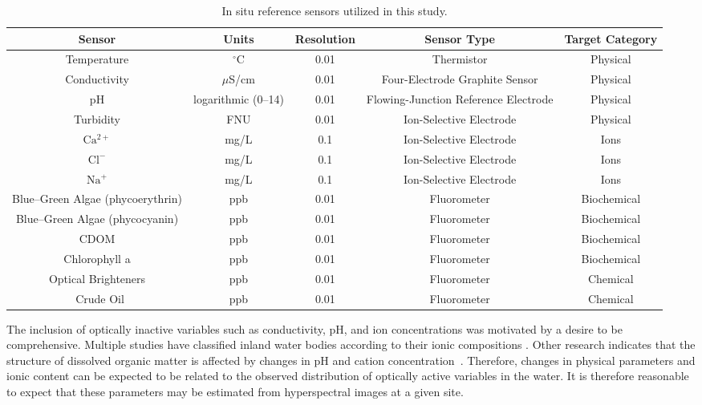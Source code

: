 \begin{sidewaystable}[p!]
  \caption{In situ reference sensors utilized in this study.}
  \label{tab:sensors}
  \begin{center}
    \begin{tabular}{ccccc} \hline
      \textbf{Sensor}	& \textbf{Units} & \textbf{Resolution} & \textbf{Sensor Type} & \textbf{Target Category}\\ \hline
      Temperature & $^{\circ}$C & 0.01 & Thermistor & Physical \\
      Conductivity & $\mu$S/cm & 0.01 & Four-Electrode Graphite Sensor & Physical  \\
      pH & logarithmic (0--14) & 0.01 & Flowing-Junction Reference Electrode & Physical \\
      Turbidity & FNU & 0.01 & Ion-Selective Electrode & Physical \\
      $\mathrm{Ca^{2+}}$ & mg/L & 0.1 & Ion-Selective Electrode & Ions \\
      $\mathrm{Cl^-}$ & mg/L & 0.1 & Ion-Selective Electrode & Ions \\
      $\mathrm{Na^+}$ & mg/L & 0.1 & Ion-Selective Electrode & Ions \\
      Blue--Green Algae (phycoerythrin) & ppb & 0.01 & Fluorometer & Biochemical \\
      Blue--Green Algae (phycocyanin) & ppb & 0.01  & Fluorometer & Biochemical \\
      CDOM & ppb & 0.01 & Fluorometer & Biochemical \\
      Chlorophyll a & ppb & 0.01 & Fluorometer & Biochemical \\
      Optical Brighteners & ppb & 0.01 & Fluorometer & Chemical \\\
      Crude Oil & ppb & 0.01 & Fluorometer & Chemical
    \end{tabular}
  \end{center}
\end{sidewaystable}


The inclusion of optically inactive variables such as conductivity, pH, and ion concentrations was motivated by a desire to be comprehensive. Multiple studies have classified inland water bodies according to their ionic compositions \cite{piper1944graphic, dordoni2023preliminary}. Other research indicates that the structure of dissolved organic matter is affected by changes in pH and cation concentration~\cite{pace2012ph}. Therefore, changes in physical parameters and ionic content can be expected to be related to the observed distribution of optically active variables in the water. It is therefore reasonable to expect that these parameters may be estimated from hyperspectral images at a given site.



